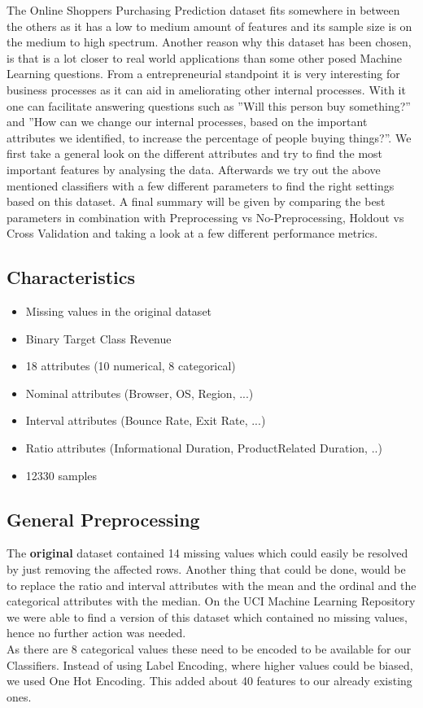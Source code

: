\documentclass{article}
\begin{document}
The Online Shoppers Purchasing Prediction dataset fits somewhere in between the others as it has a low to medium amount of features and its sample size is on the medium to high spectrum. Another reason why  this dataset has been chosen, is that is a lot closer to real world applications than some other posed Machine Learning questions. From a entrepreneurial standpoint it is very interesting for business processes as it can aid in ameliorating other internal processes. With it one can facilitate answering questions such as ''Will this person buy something?'' and ''How can we change our internal processes, based on the important attributes we identified, to increase the percentage of people buying things?''. We first take a general look on the different attributes and try to find the most important features by analysing the data. Afterwards we try out the above mentioned classifiers with a few different parameters to find the right settings based on this dataset. A final summary will be given by comparing the best parameters in combination with Preprocessing vs No-Preprocessing, Holdout vs Cross Validation and taking a look at a few different performance metrics.

\subsection{Characteristics}

\begin{itemize}
\item Missing values in the original dataset
\item Binary Target Class Revenue
\item 18 attributes (10 numerical, 8 categorical)
\item Nominal attributes (Browser, OS, Region, ...)
\item Interval attributes (Bounce Rate, Exit Rate, ...)
\item Ratio attributes (Informational Duration, ProductRelated Duration, ..)
\item 12330 samples
\end{itemize}

\subsection{General Preprocessing} \label{GenPrepro}
The \textbf{original} dataset contained 14 missing values which could easily be resolved by just removing the affected rows. Another thing that could be done, would be to replace the ratio and interval attributes with the mean and the ordinal and the categorical attributes with the median. On the UCI Machine Learning Repository we were able to find a version of this dataset which contained no missing values, hence no further action was needed. \\
\newline
As there are 8 categorical values these need to be encoded to be available for our Classifiers. Instead of using Label Encoding, where higher values could be biased, we used One Hot Encoding. This added about 40 features to our already existing ones.
\end{document}
